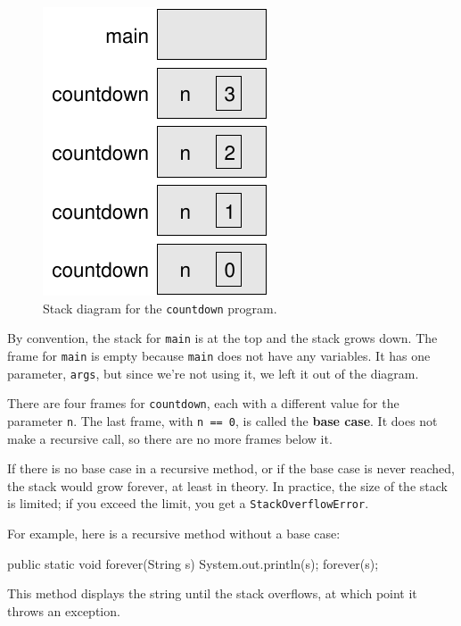 \documentclass[12pt]{book}
\theoremstyle{exercise}
\newcommand{\java}[1]{\verb"#1"}
\begin{document}
\begin{figure}[!ht]
\begin{center}
\includegraphics{figs/stack2.pdf}
\caption{Stack diagram for the \java{countdown} program.}
\label{fig.stack2}
\end{center}
\end{figure}

By convention, the stack for \java{main} is at the top and the stack grows down.
The frame for \java{main} is empty because \java{main} does not have any variables.
It has one parameter, \java{args}, but since we're not using it, we left it out of the diagram.

There are four frames for \java{countdown}, each with a different value for the parameter \java{n}.
The last frame, with \java{n == 0}, is called the {\bf base case}.
It does not make a recursive call, so there are no more frames below it.

If there is no base case in a recursive method, or if the base case is never reached, the stack would grow forever, at least in theory.
In practice, the size of the stack is limited; if you exceed the limit, you get a \java{StackOverflowError}.

For example, here is a recursive method without a base case:

\begin{code}
    public static void forever(String s) {
        System.out.println(s);
        forever(s);
    }
\end{code}


This method displays the string until the stack overflows, at which point it throws an exception.
\end{document}
